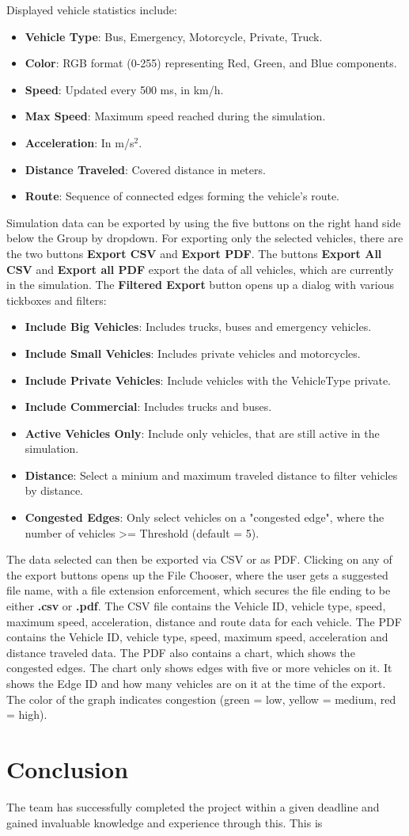 \documentclass[a4paper, 12pt]{article}
\begin{document}
Displayed vehicle statistics include:
\begin{itemize}
    \item \textbf{Vehicle Type}: Bus, Emergency, Motorcycle, Private, Truck.
    \item \textbf{Color}: RGB format (0-255) representing Red, Green, and Blue components.
    \item \textbf{Speed}: Updated every 500 ms, in km/h.
    \item \textbf{Max Speed}: Maximum speed reached during the simulation.
    \item \textbf{Acceleration}: In m/s$^2$.
    \item \textbf{Distance Traveled}: Covered distance in meters.
    \item \textbf{Route}: Sequence of connected edges forming the vehicle’s route.
\end{itemize}

Simulation data can be exported by using the five buttons on the right hand side below the Group by dropdown. For exporting only the selected vehicles, there are the two buttons \textbf{Export CSV} and \textbf{Export PDF}. The buttons \textbf{Export All CSV} and \textbf{Export all PDF} export the data of all vehicles, which are currently in the simulation. 
The \textbf{Filtered Export} button opens up a dialog with various tickboxes and filters:
\begin{itemize}
    \item \textbf{Include Big Vehicles}: Includes trucks, buses and emergency vehicles.
    \item \textbf{Include Small Vehicles}: Includes private vehicles and motorcycles.
    \item \textbf{Include Private Vehicles}: Include vehicles with the VehicleType private.
    \item \textbf{Include Commercial}: Includes trucks and buses.
    \item \textbf{Active Vehicles Only}: Include only vehicles, that are still active in the simulation. 
    \item \textbf{Distance}: Select a minium and maximum traveled distance to filter vehicles by distance.
    \item \textbf{Congested Edges}: Only select vehicles on a "congested edge", where the number of vehicles >= Threshold (default = 5). 
\end{itemize}
The data selected can then be exported via CSV or as PDF. Clicking on any of the export buttons opens up the File Chooser, where the user gets a suggested file name, with a file extension enforcement, which secures the file ending to be either \textbf{.csv} or \textbf{.pdf}.
The CSV file contains the Vehicle ID, vehicle type, speed, maximum speed, acceleration, distance and route data for each vehicle.
The PDF contains  the Vehicle ID, vehicle type, speed, maximum speed, acceleration and distance traveled data. The PDF also contains a chart, which shows the congested edges. The chart only shows edges with five or more vehicles on it. It shows the Edge ID and how many vehicles are on it at the time of the export. The color of the graph indicates congestion (green = low, yellow = medium, red = high).


\section{Conclusion}
The team has successfully completed the project within a given deadline and gained invaluable knowledge and experience through this. This is 
\end{document}
